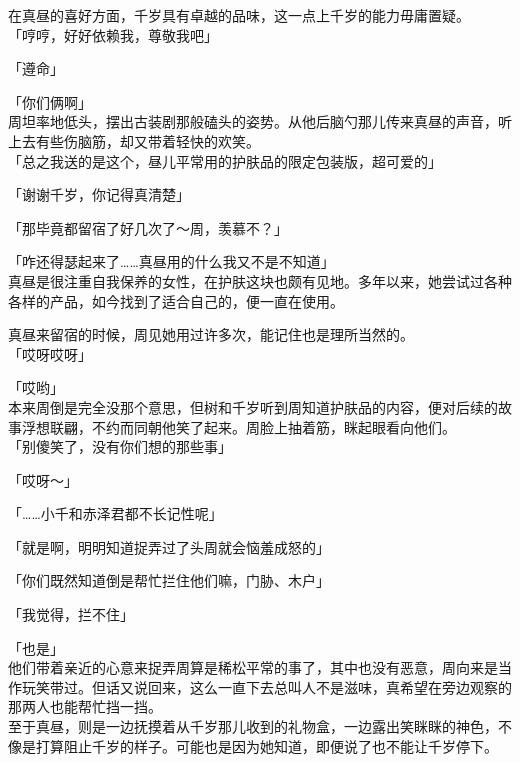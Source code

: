 在真昼的喜好方面，千岁具有卓越的品味，这一点上千岁的能力毋庸置疑。\\

「哼哼，好好依赖我，尊敬我吧」

「遵命」

「你们俩啊」\\

周坦率地低头，摆出古装剧那般磕头的姿势。从他后脑勺那儿传来真昼的声音，听上去有些伤脑筋，却又带着轻快的欢笑。\\

「总之我送的是这个，昼儿平常用的护肤品的限定包装版，超可爱的」

「谢谢千岁，你记得真清楚」

「那毕竟都留宿了好几次了～周，羡慕不？」

「咋还得瑟起来了……真昼用的什么我又不是不知道」\\

真昼是很注重自我保养的女性，在护肤这块也颇有见地。多年以来，她尝试过各种各样的产品，如今找到了适合自己的，便一直在使用。

真昼来留宿的时候，周见她用过许多次，能记住也是理所当然的。\\

「哎呀哎呀」

「哎哟」\\

本来周倒是完全没那个意思，但树和千岁听到周知道护肤品的内容，便对后续的故事浮想联翩，不约而同朝他笑了起来。周脸上抽着筋，眯起眼看向他们。\\

「别傻笑了，没有你们想的那些事」

「哎呀～」

「……小千和赤泽君都不长记性呢」

「就是啊，明明知道捉弄过了头周就会恼羞成怒的」

「你们既然知道倒是帮忙拦住他们嘛，门胁、木户」

「我觉得，拦不住」

「也是」\\

他们带着亲近的心意来捉弄周算是稀松平常的事了，其中也没有恶意，周向来是当作玩笑带过。但话又说回来，这么一直下去总叫人不是滋味，真希望在旁边观察的那两人也能帮忙挡一挡。\\

至于真昼，则是一边抚摸着从千岁那儿收到的礼物盒，一边露出笑眯眯的神色，不像是打算阻止千岁的样子。可能也是因为她知道，即便说了也不能让千岁停下。\\

